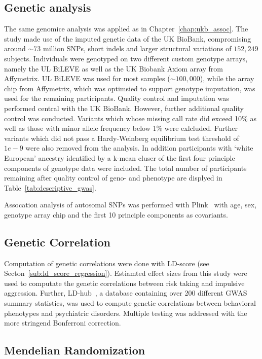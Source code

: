 \subsection{Genetic analysis}
\label{sub:genetic_analysis}
The same genomice analysis was applied as in Chapter~\ref{chap:ukb_assoc}.
The study made use of the imputed genetic data of the UK BioBank, compromising around $\sim73$ million SNPs, short indels and larger structural variations of $152,249$ subjects.
Individuals were genotyped on two different custom genotype arrays, namely the UL BiLEVE as well as the UK Biobank Axiom array from Affymetrix. 
UL BiLEVE was used for most samples ($\sim100,000$), while the array chip from Affymetrix, which was optimsied to support genotype imputation, was used for the remaining participants. 
Quality control and imputation was performed central with the UK BioBank.
However, further additional quality control was conducted.
Variants which whose missing call rate did exceed 10\% as well as those with minor allele frequency below 1\% were exlcluded.
Further variants which did not pass a Hardy-Weinberg equilibrium test threshold of $1e-9$ were also removed from the analysis.
In addition participants with `white European' ancestry identified by a k-mean cluser of the first four principle components of genotype data were included.
The total number of participants remaining after quality control of geno- and phenotype are displyed in Table~\ref{tab:descriptive_gwas}.

Assocation analysis of autosomal SNPs was performed with Plink~\cite{Purcell2007,Chang2015} with age, sex, genotype array chip and the first 10 principle components as covariants.

\subsection{Genetic Correlation}
\label{sub:genetic_correlation}

Computation of genetic correlations were done with LD-score (see Secton~\ref{sub:ld_score_regression}).
Estiamted effect sizes from this study were used to computate the genetic correlations between risk taking and impulsive aggression.
Further, LD-hub~\cite{ZHENG2016}, a database containing over 200 different GWAS summary statistics, was used to compute genetic correlations between behavioral phenotypes and psychiatric disorders.
Multiple testing was addressed with the more stringend Bonferroni correction.

\subsection{Mendelian Randomization}
\label{sub:joint_association_study}

